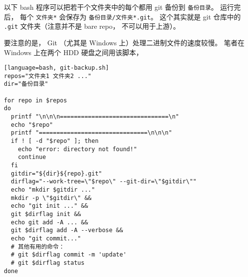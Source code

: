 
\begin{issues}
\issueDraft
\end{issues}


以下 bash 程序可以把若干个文件夹中的每个都用 git 备份到 \verb|备份目录|。 运行完后， 每个 \verb|文件夹*| 会保存为 \verb|备份目录/文件夹*.git|。 这个其实就是 git 仓库中的 \verb|.git| 文件夹（注意并不是 bare repo， 不可以用于上游）。

要注意的是， Git （尤其是 Windows 上）处理二进制文件的速度较慢。 笔者在 Windows 上在两个 HDD 硬盘之间用该脚本， 

\begin{lstlisting}[language=bash, git-backup.sh]
repos="文件夹1 文件夹2 ..."
dir="备份目录"

for repo in $repos
do
  printf "\n\n\n===============================\n"
  echo "$repo"
  printf "===============================\n\n\n"
  if ! [ -d "$repo" ]; then
    echo "error: directory not found!"
    continue
  fi
  gitdir="${dir}${repo}.git"
  dirflag="--work-tree=\"$repo\" --git-dir=\"$gitdir\""
  echo "mkdir $gitdir ..."
  mkdir -p \"$gitdir\" &&
  echo "git init ..." &&
  git $dirflag init &&
  echo git add -A ... &&
  git $dirflag add -A --verbose &&
  echo "git commit..."
  # 其他有用的命令：
  # git $dirflag commit -m 'update'
  # git $dirflag status
done
\end{lstlisting}
